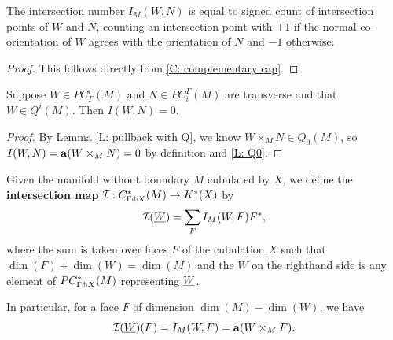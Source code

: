 \begin{lemma}\label{L: intersection number}
The intersection number $I_M(W,N)$ is equal to signed count of intersection points of $W$ and $N$, counting an intersection point with $+1$ if the normal co-orientation of $W$ agrees with the orientation of $N$ and $-1$ otherwise.
\end{lemma}
\begin{proof}
This follows directly from \cref{C: complementary cap}.

\end{proof}

\begin{lemma}\label{L: Q-trivial intersection}
Suppose $W \in PC_\Gamma^i(M)$ and $N \in PC_{i}^\Gamma(M)$ are transverse and that $W \in Q^i(M)$. Then $I(W,N) = 0$.
\end{lemma}
\begin{proof}
By Lemma \ref{L: pullback with Q}, we know $W \times_M N \in Q_0(M)$, so $I(W,N) = \mathbf{a}(W \times_M N) = 0$ by definition and \cref{L: Q0}.
\end{proof}


\begin{definition}\label{D: intersection homomorphism}
Given the manifold without boundary $M$ cubulated by $X$, we define the \textbf{intersection map} $\mathcal{I}: C^*_{\Gamma\pitchfork X}(M) \to K^*(X)$ by $$\mathcal{I}(\underline{W}) = \sum_F I_M(W,F)F^*,$$ where the sum is taken over faces $F$ of the cubulation $X$ such that $\dim(F)+\dim(W) = \dim(M)$ and the $W$ on the righthand side is any element of $PC^*_{\Gamma\pitchfork X}(M)$ representing $\underline{W}$.

In particular, for a face $F$ of dimension $\dim(M)-\dim(W)$, we have $$\mathcal{I}(\underline{W})(F) = I_M(W,F) = \mathbf{a}(W \times_M F).$$
\end{definition}



